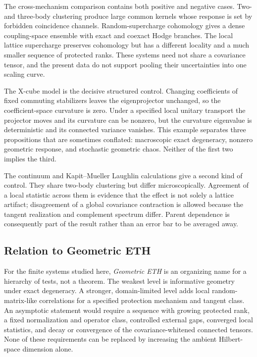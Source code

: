 The cross-mechanism comparison contains both positive and negative cases.
Two- and three-body clustering produce large common kernels whose response is
set by forbidden coincidence channels.  Random-supercharge cohomology gives a
dense coupling-space ensemble with exact and coexact Hodge branches.  The
local lattice supercharge preserves cohomology but has a different locality
and a much smaller sequence of protected ranks.  These systems need not share
a covariance tensor, and the present data do not support pooling their
uncertainties into one scaling curve.

The X-cube model is the decisive structured control.  Changing coefficients
of fixed commuting stabilizers leaves the eigenprojector unchanged, so the
coefficient-space curvature is zero.  Under a specified local unitary
transport the projector moves and its curvature can be nonzero, but the
curvature eigenvalue is deterministic and its connected variance vanishes.
This example separates three propositions that are sometimes conflated:
macroscopic exact degeneracy, nonzero geometric response, and stochastic
geometric chaos.  Neither of the first two implies the third.

The continuum and Kapit--Mueller Laughlin calculations give a second kind of
control.  They share two-body clustering but differ microscopically.  Agreement
of a local statistic across them is evidence that the effect is not solely a
lattice artifact; disagreement of a global covariance contraction is allowed
because the tangent realization and complement spectrum differ.  Parent
dependence is consequently part of the result rather than an error bar to be
averaged away.

\subsection{Relation to Geometric ETH}

For the finite systems studied here, \emph{Geometric ETH} is an organizing name
for a hierarchy of tests, not a theorem.  The weakest level is informative
geometry under exact degeneracy.  A stronger, domain-limited level adds local
random-matrix-like correlations for a specified protection mechanism and
tangent class.  An asymptotic statement would require a sequence with growing
protected rank, a fixed normalization and operator class, controlled external
gaps, converged local statistics, and decay or convergence of the
covariance-whitened connected tensors.  None of these requirements can be
replaced by increasing the ambient Hilbert-space dimension alone.

